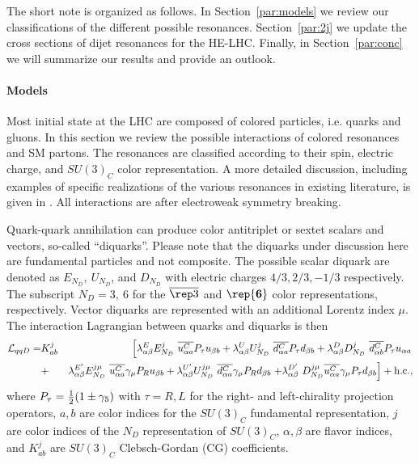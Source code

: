 The short note is organized as follows.  In Section~\ref{par:models} we review our classifications of the different possible resonances.  Section~\ref{par:2j} we update the cross sections of dijet resonances for the HE-LHC.  Finally, in Section~\ref{par:conc} we will summarize our results and provide an outlook.

\paragraph*{Models}
\label{par:models}
Most initial state at the LHC are composed of colored particles, i.e. quarks and gluons.  In this section we review the possible interactions of colored resonances and SM partons.  The resonances are classified according to their spin, electric charge, and $SU(3)_C$ color representation.  A more detailed discussion, including examples of specific realizations of the various resonances in existing literature, is given in .  All interactions are after electroweak symmetry breaking.

Quark-quark annihilation can produce color antitriplet or sextet scalars and vectors, so-called ``diquarks''.  Please note that the diquarks under discussion here are fundamental particles and not composite.  The possible scalar diquark are denoted as  $E_{N_D},~U_{N_D}$, and $D_{N_D}$ with electric charges $4/3,2/3,-1/3$ respectively.  The subscript $N_D=3,~6$ for the $\overline{\rep3}$ and $\rep{\mathbf6}$ color representations, respectively.  Vector diquarks are represented with an additional Lorentz index $\mu$.  The interaction Lagrangian between quarks and diquarks is then
\begin{eqnarray}
\mathcal{L}_{qqD} = &K^j_{ab}& \left[ \lambda^{E}_{\alpha\beta}
E^j_{N_D}\ \overline{u^C_{\alpha a}}P_\tau u_{\beta b}
+\lambda^{U}_{\alpha\beta} U^j_{N_D}\ \overline{d^{C}_{\alpha a}}P_\tau d_{\beta b}
+\lambda^{D}_{\alpha\beta} D^j_{N_D}\ \overline{d^C_{\alpha b}}P_\tau u_{\alpha a} \right. \\
&
+&\lambda^{E'}_{\alpha\beta} E^{j\mu}_{N_D}\  \overline{u^C_{\alpha a}}\gamma_\mu P_R u_{\beta b}
+ \lambda^{U'}_{\alpha\beta}  U^{j\mu}_{N_D}\ \overline{d^C_{\alpha a}}\gamma_\mu P_R d_{\beta b}   %
\left.
+\lambda^{D'}_{\alpha\beta}\ D^{j\mu}_{N_D} \overline{u^C_{\alpha a}}\gamma_\mu P_\tau d_{\beta b}
\right]
+\rm{h.c.},\nonumber
\label{eq:qq}
\end{eqnarray}
where $P_{\tau}={1\over2}(1\pm\gamma_5)$ with $\tau=R,L$ for the right- and left-chirality projection operators, $a,b$ are color indices for the $SU(3)_C$ fundamental representation, $j$ are color indices of the $N_D$ representation of $SU(3)_C$, $\alpha,\beta$ are flavor indices,  and $K^j_{ab}$ are $SU(3)_{C}$ Clebsch-Gordan (CG) coefficients.

